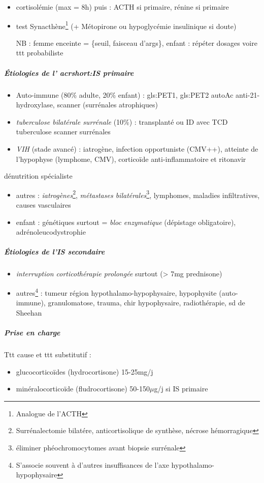 \documentclass[11pt]{article}
\begin{document}
\begin{itemize}
\item cortisolémie (max = 8h) puis : ACTH \inc{} si primaire, rénine \inc si primaire
\item test Synacthène\footnote{Analogue de l'ACTH} (+ Métopirone ou hypoglycémie insulinique si doute)

NB : femme enceinte = \{\inc seuil, faisceau d'args\}, enfant : répéter dosages
voire ttt probabiliste
\end{itemize}

\subparagraph{Étiologies de l' acrshort:IS primaire}
\label{sec:orgfaf1205}
\begin{itemize}
\item Auto-immune (80\% adulte, 20\% enfant) : gls:PET1, gls:PET2 \thus autoAc anti-21-hydroxylase, scanner (surrénales atrophiques)
\item \emph{tuberculose bilatérale surrénale} (10\%) : transplanté ou ID avec TCD tuberculose
\thus scanner surrénales
\item \emph{VIH} (stade avancé) : iatrogène, infection opportuniste (CMV++), atteinte de
l'hypophyse (lymphome, CMV), corticoïde anti-inflammatoire et ritonavir
\end{itemize}
\danger dénutrition \thus spécialiste
\begin{itemize}
\item autres : \emph{iatrogènes}\footnote{Surrénalectomie bilatére, anticortisolique de synthèse, nécrose hémorragique}, \emph{métastases bilatérales}\footnote{\danger éliminer phéochromocytomes avant biopsie surrénale}, lymphomes, maladies
infiltratives, causes vasculaires
\item enfant : génétiques surtout = \emph{bloc enzymatique} (dépistage obligatoire), adrénoleucodystrophie
\end{itemize}

\subparagraph{Étiologies de l'IS secondaire}
\label{sec:orgfa13c61}
\begin{itemize}
\item \emph{interruption corticothérapie prolongée} surtout (> 7mg prednisone)
\item autres\footnote{S'associe souvent à d'autres insuffisances de l'axe hypothalamo-hypophysaire} : tumeur région hypothalamo-hypophysaire, hypophysite (auto-immune),
granulomatose, trauma, chir hypophysaire, radiothérapie, sd de Sheehan
\end{itemize}

\subparagraph{Prise en charge}
\label{sec:org340aa87}
Ttt cause et ttt substitutif :
\begin{itemize}
\item glucocorticoïdes (hydrocortisone) 15-25mg/j
\item minéralocorticoïde (fludrocortisone) 50-150\(\mu\)g/j si IS primaire
\end{itemize}
\end{document}
